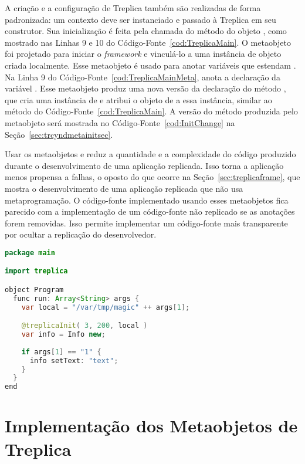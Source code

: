 A criação e a configuração de Treplica também são realizadas de forma padronizada: um contexto deve ser instanciado e passado à Treplica em seu construtor. Sua inicialização é feita pela chamada do método  do objeto , como mostrado nas Linhas 9 e 10 do Código-Fonte~\ref{cod:TreplicaMain}. O metaobjeto  foi projetado para iniciar o \emph{framework} e vinculá-lo a uma instância de objeto criada localmente. Esse metaobjeto é usado para anotar variáveis que estendam . Na Linha 9 do Código-Fonte~\ref{cod:TreplicaMainMeta},  anota a declaração da variável . Esse metaobjeto produz uma nova versão da declaração do método , que cria uma instância de  e atribui o objeto de  a essa instância, similar ao método  do Código-Fonte~\ref{cod:TreplicaMain}. A versão do método  produzida pelo metaobjeto será mostrada no Código-Fonte~\ref{cod:InitChange} na Seção~\ref{sec:trcyndmetainitsec}.

Usar os metaobjetos  e  reduz a quantidade e a complexidade do código produzido durante o desenvolvimento de uma aplicação replicada. Isso torna a aplicação menos propensa a falhas, o oposto do que ocorre na Seção~\ref{sec:treplicaframe}, que mostra o desenvolvimento de uma aplicação replicada que não usa metaprogramação. O código-fonte implementado usando esses metaobjetos fica parecido com a implementação de um código-fonte não replicado se as anotações forem removidas. Isso permite implementar um código-fonte mais transparente por ocultar a replicação do desenvolvedor. 

\begin{lstlisting}[language=Java, caption={Configuração de Treplica usando metaobjetos}, label={cod:TreplicaMainMeta}]
package main

import treplica

object Program 
  func run: Array<String> args {
    var local = "/var/tmp/magic" ++ args[1];

    @treplicaInit( 3, 200, local )
    var info = Info new;
    
    if args[1] == "1" {
      info setText: "text";
    }
  }
end
\end{lstlisting}

\section{Implementação dos Metaobjetos de Treplica}
\label{sec:treplicacyanmetasecret}

